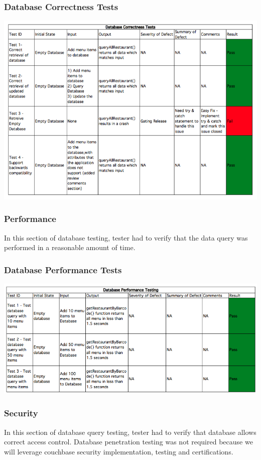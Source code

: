 \documentclass[12pt, titlepage]{article}
\begin{document}
\subsubsection{Database Correctness Tests }
\includegraphics[width=\textwidth,height=\textheight,keepaspectratio]{correctness_tests.png}

\subsubsection{Performance}
In this section of database testing, tester had to verify that the data query was performed in a reasonable amount of time. 
\subsubsection{Database Performance Tests }
\includegraphics[width=\textwidth,height=\textheight,keepaspectratio]{performance_tests.png}

\subsubsection{Security}
In this section of database query testing, tester had to verify that database allows correct access control. Database penetration testing was not required because we will leverage couchbase security implementation, testing and certifications.
\end{document}
